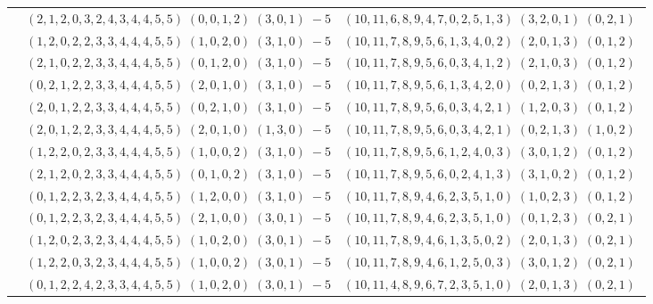 \documentclass[11pt]{article}
\begin{document}
\begin{longtable}[l]{|c|c|c|}
 \cline{2-3} 
 & $(2 ,1 ,2 ,0 ,3 ,2 ,4 ,3 ,4 ,4 ,5 ,5) \;(0 ,0 ,1 ,2) \;(3 ,0 ,1) \;-5$ & $(10 ,11 ,6 ,8 ,9 ,4 ,7 ,0 ,2 ,5 ,1 ,3) \;(3 ,2 ,0 ,1) \;(0 ,2 ,1) \;$\\ 
 \cline{2-3} 
 & $(1 ,2 ,0 ,2 ,2 ,3 ,3 ,4 ,4 ,4 ,5 ,5) \;(1 ,0 ,2 ,0) \;(3 ,1 ,0) \;-5$ & $(10 ,11 ,7 ,8 ,9 ,5 ,6 ,1 ,3 ,4 ,0 ,2) \;(2 ,0 ,1 ,3) \;(0 ,1 ,2) \;$\\ 
 \cline{2-3} 
 & $(2 ,1 ,0 ,2 ,2 ,3 ,3 ,4 ,4 ,4 ,5 ,5) \;(0 ,1 ,2 ,0) \;(3 ,1 ,0) \;-5$ & $(10 ,11 ,7 ,8 ,9 ,5 ,6 ,0 ,3 ,4 ,1 ,2) \;(2 ,1 ,0 ,3) \;(0 ,1 ,2) \;$\\ 
 \cline{2-3} 
 & $(0 ,2 ,1 ,2 ,2 ,3 ,3 ,4 ,4 ,4 ,5 ,5) \;(2 ,0 ,1 ,0) \;(3 ,1 ,0) \;-5$ & $(10 ,11 ,7 ,8 ,9 ,5 ,6 ,1 ,3 ,4 ,2 ,0) \;(0 ,2 ,1 ,3) \;(0 ,1 ,2) \;$\\ 
 \cline{2-3} 
 & $(2 ,0 ,1 ,2 ,2 ,3 ,3 ,4 ,4 ,4 ,5 ,5) \;(0 ,2 ,1 ,0) \;(3 ,1 ,0) \;-5$ & $(10 ,11 ,7 ,8 ,9 ,5 ,6 ,0 ,3 ,4 ,2 ,1) \;(1 ,2 ,0 ,3) \;(0 ,1 ,2) \;$\\ 
 \cline{2-3} 
 & $(2 ,0 ,1 ,2 ,2 ,3 ,3 ,4 ,4 ,4 ,5 ,5) \;(2 ,0 ,1 ,0) \;(1 ,3 ,0) \;-5$ & $(10 ,11 ,7 ,8 ,9 ,5 ,6 ,0 ,3 ,4 ,2 ,1) \;(0 ,2 ,1 ,3) \;(1 ,0 ,2) \;$\\ 
 \cline{2-3} 
 & $(1 ,2 ,2 ,0 ,2 ,3 ,3 ,4 ,4 ,4 ,5 ,5) \;(1 ,0 ,0 ,2) \;(3 ,1 ,0) \;-5$ & $(10 ,11 ,7 ,8 ,9 ,5 ,6 ,1 ,2 ,4 ,0 ,3) \;(3 ,0 ,1 ,2) \;(0 ,1 ,2) \;$\\ 
 \cline{2-3} 
 & $(2 ,1 ,2 ,0 ,2 ,3 ,3 ,4 ,4 ,4 ,5 ,5) \;(0 ,1 ,0 ,2) \;(3 ,1 ,0) \;-5$ & $(10 ,11 ,7 ,8 ,9 ,5 ,6 ,0 ,2 ,4 ,1 ,3) \;(3 ,1 ,0 ,2) \;(0 ,1 ,2) \;$\\ 
 \cline{2-3} 
 & $(0 ,1 ,2 ,2 ,3 ,2 ,3 ,4 ,4 ,4 ,5 ,5) \;(1 ,2 ,0 ,0) \;(3 ,1 ,0) \;-5$ & $(10 ,11 ,7 ,8 ,9 ,4 ,6 ,2 ,3 ,5 ,1 ,0) \;(1 ,0 ,2 ,3) \;(0 ,1 ,2) \;$\\ 
 \cline{2-3} 
 & $(0 ,1 ,2 ,2 ,3 ,2 ,3 ,4 ,4 ,4 ,5 ,5) \;(2 ,1 ,0 ,0) \;(3 ,0 ,1) \;-5$ & $(10 ,11 ,7 ,8 ,9 ,4 ,6 ,2 ,3 ,5 ,1 ,0) \;(0 ,1 ,2 ,3) \;(0 ,2 ,1) \;$\\ 
 \cline{2-3} 
 & $(1 ,2 ,0 ,2 ,3 ,2 ,3 ,4 ,4 ,4 ,5 ,5) \;(1 ,0 ,2 ,0) \;(3 ,0 ,1) \;-5$ & $(10 ,11 ,7 ,8 ,9 ,4 ,6 ,1 ,3 ,5 ,0 ,2) \;(2 ,0 ,1 ,3) \;(0 ,2 ,1) \;$\\ 
 \cline{2-3} 
 & $(1 ,2 ,2 ,0 ,3 ,2 ,3 ,4 ,4 ,4 ,5 ,5) \;(1 ,0 ,0 ,2) \;(3 ,0 ,1) \;-5$ & $(10 ,11 ,7 ,8 ,9 ,4 ,6 ,1 ,2 ,5 ,0 ,3) \;(3 ,0 ,1 ,2) \;(0 ,2 ,1) \;$\\ 
 \cline{2-3} 
 & $(0 ,1 ,2 ,2 ,4 ,2 ,3 ,3 ,4 ,4 ,5 ,5) \;(1 ,0 ,2 ,0) \;(3 ,0 ,1) \;-5$ & $(10 ,11 ,4 ,8 ,9 ,6 ,7 ,2 ,3 ,5 ,1 ,0) \;(2 ,0 ,1 ,3) \;(0 ,2 ,1) \;$\\ 

\end{longtable}
\end{document}

